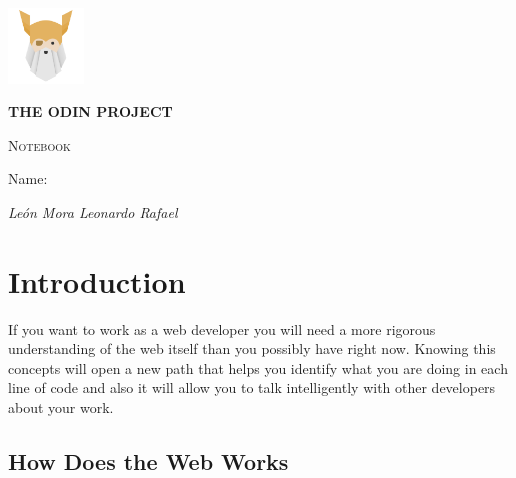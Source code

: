 \documentclass{article}
\begin{document}
	
	\begin{titlepage}
		\centering
		\vfill
		\vspace{1cm}
		\includegraphics[width=0.15\textwidth]{odin_logo.png}\par\vspace{1cm}
		\vspace{1.5cm}
		{\LARGE\bfseries THE ODIN PROJECT \par}
		{\scshape\Large Notebook \par}
		\vspace{2cm}
		\vfill
		Name: \par
		{\footnotesize\itshape León Mora Leonardo Rafael \par}
		\vfill
	\end{titlepage}
	
	\thispagestyle{empty}
	
	\tableofcontents
	
	\pagebreak
	\setcounter{page}{1}
	
	\section{Introduction}
	
	\noindent If you want to work as a web developer you will need a more rigorous understanding of the web itself than you possibly have right now. Knowing this concepts will open a new path that helps you identify what you are doing in each line of code and also it will allow you to talk intelligently with other developers about your work.
	
	\subsection{How Does the Web Works}
	
\end{document}
